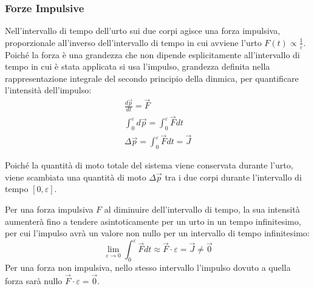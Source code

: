 \documentclass{article}
\numberwithin{equation}{subsection}
\begin{document}
 
\subsubsection{Forze Impulsive}
Nell'intervallo di tempo dell'urto sui due corpi agisce una 
forza impulsiva, proporzionale all'inverso dell'intervallo di tempo in cui avviene l'urto 
$F(t)\propto \displaystyle\frac{1}{\varepsilon}$. 
Poiché la forza è una grandezza che non dipende esplicitamente all'intervallo di 
tempo in cui è stata applicata si usa l'impulso, grandezza definita nella rappresentazione integrale del secondo principio della dinmica, per quantificare 
l'intensità dell'impulso: 
\begin{gather*}
    \displaystyle\frac{d\vec{p}}{dt}=\vec{F}\\
    \displaystyle\int_{0}^{\varepsilon}d\vec{p}=\int_{0}^{\varepsilon}\vec{F}dt\\
    \Delta\vec{p}=\displaystyle\int_{0}^{\varepsilon}\vec{F}dt=\vec{J}
\end{gather*}

Poiché la quantità di moto totale del sistema viene conservata 
durante l'urto, viene scambiata una quantità di moto $\Delta\vec{p}$ 
tra i due corpi durante l'intervallo di tempo $[0,\varepsilon]$. 

Per una forza impulsiva $F$ al diminuire dell'intervallo di tempo, la sua intensità aumenterà fino a tendere asintoticamente per un urto in un tempo infinitesimo, per cui 
l'impulso avrà un valore non nullo per un intervallo di tempo infinitesimo:
\begin{equation*}
    \lim_{\varepsilon\to 0}\displaystyle\int_{0}^{\varepsilon}\vec{F}dt\approx\vec{F}\cdot\varepsilon=\vec{J}\neq\vec{0}
\end{equation*}
Per una forza non impulsiva, nello stesso intervallo l'impulso dovuto a quella forza sarà nullo $\vec{F}\cdot\varepsilon=\vec{0}$. 

\begin{center}\end{center}
\end{document}
